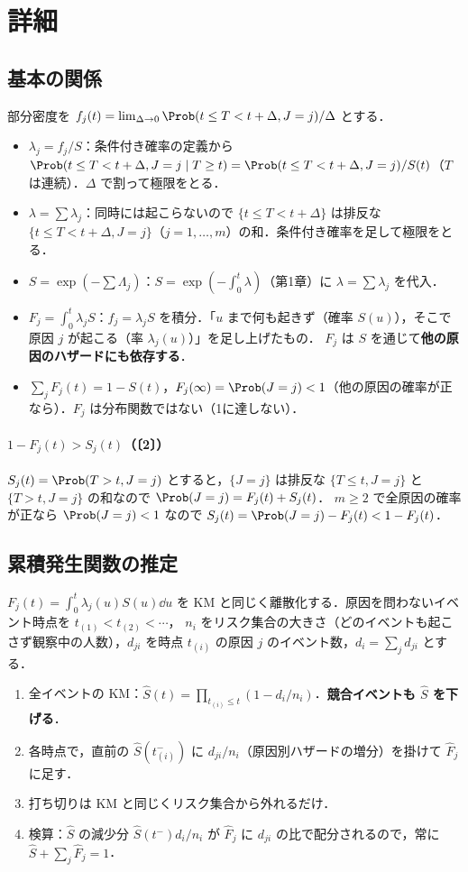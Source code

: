 \section{詳細}\label{sec:m05-shosai}
\subsection{基本の関係}
部分密度を $f_j(t)=\lim_{\Delta\to0}\Prob(t\le T<t+\Delta,J=j)/\Delta$ とする．
\begin{itemize}
\item \textbf{$\lambda_j=f_j/S$}：条件付き確率の定義から $\Prob(t\le T<t+\Delta,J=j\mid T\ge t)=\Prob(t\le T<t+\Delta,J=j)/S(t)$（$T$ は連続）．$\Delta$ で割って極限をとる．
\item \textbf{$\lambda=\sum\lambda_j$}：同時には起こらないので $\{t\le T<t+\Delta\}$ は排反な $\{t\le T<t+\Delta,J=j\}$（$j=1,\dots,m$）の和．条件付き確率を足して極限をとる．
\item \textbf{$S=\exp(-\sum\Lambda_j)$}：$S=\exp(-\int_0^t\lambda)$（第1章）に $\lambda=\sum\lambda_j$ を代入．
\item \textbf{$F_j=\int_0^t\lambda_jS$}：$f_j=\lambda_jS$ を積分．「$u$ まで何も起きず（確率 $S(u)$），そこで原因 $j$ が起こる（率 $\lambda_j(u)$）」を足し上げたもの．
      $F_j$ は $S$ を通じて\textbf{他の原因のハザードにも依存する}．
\item $\sum_jF_j(t)=1-S(t)$，$F_j(\infty)=\Prob(J=j)<1$（他の原因の確率が正なら）．$F_j$ は分布関数ではない（1に達しない）．
\end{itemize}
\paragraph{$1-F_j(t)>S_j(t)$（〔2〕）}
$S_j(t)=\Prob(T>t,J=j)$ とすると，$\{J=j\}$ は排反な $\{T\le t,J=j\}$ と $\{T>t,J=j\}$ の和なので $\Prob(J=j)=F_j(t)+S_j(t)$．
$m\ge2$ で全原因の確率が正なら $\Prob(J=j)<1$ なので $S_j(t)=\Prob(J=j)-F_j(t)<1-F_j(t)$．

\subsection{累積発生関数の推定}
$F_j(t)=\int_0^t\lambda_j(u)S(u)\dd u$ を KM と同じく離散化する．原因を問わないイベント時点を $t_{(1)}<t_{(2)}<\cdots$，
$n_i$ をリスク集合の大きさ（どのイベントも起こさず観察中の人数），$d_{ji}$ を時点 $t_{(i)}$ の原因 $j$ のイベント数，$d_i=\sum_jd_{ji}$ とする．
\begin{enumerate}
\item 全イベントの KM：$\hat S(t)=\prod_{t_{(i)}\le t}(1-d_i/n_i)$．\textbf{競合イベントも $\hat S$ を下げる}．
\item 各時点で，直前の $\hat S(t_{(i)}^-)$ に $d_{ji}/n_i$（原因別ハザードの増分）を掛けて $\hat F_j$ に足す．
\item 打ち切りは KM と同じくリスク集合から外れるだけ．
\item 検算：$\hat S$ の減少分 $\hat S(t^-)d_i/n_i$ が $\hat F_j$ に $d_{ji}$ の比で配分されるので，常に $\hat S+\sum_j\hat F_j=1$．
\end{enumerate}

